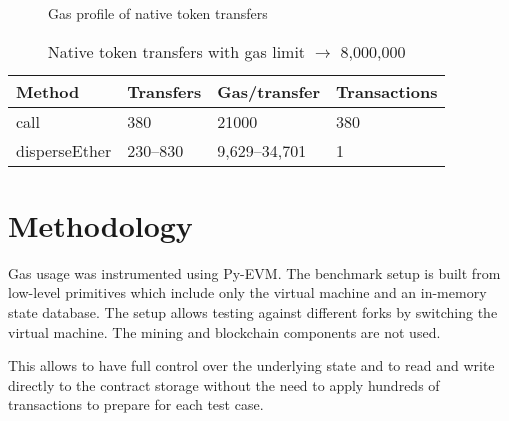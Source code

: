 \documentclass[12pt]{article}
\begin{document}
\begin{figure}[h!]
\caption{Gas profile of native token transfers}
\end{figure}


\begin{table}[]
\caption{Native token transfers with gas limit $\rightarrow$ 8,000,000}
\label{table-native}
\begin{center}
\begin{tabular}{@{}llll@{}}
Method        & Transfers & Gas/transfer  & Transactions \\ \midrule
call          & 380       & 21000         & 380          \\
disperseEther & 230--830  & 9,629--34,701 & 1           
\end{tabular}
\end{center}
\end{table}


\section{Methodology}

Gas usage was instrumented using Py-EVM\cite{pyevm}.
The benchmark setup is built from low-level primitives which include only the virtual machine and an in-memory state database.
The setup allows testing against different forks by switching the virtual machine.
The mining and blockchain components are not used.

This allows to have full control over the underlying state and to read and write directly to the contract storage without the need to apply hundreds of transactions to prepare for each test case.
\end{document}

